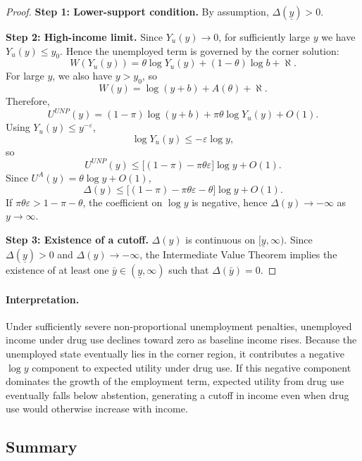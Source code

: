 \begin{proof}
\textbf{Step 1: Lower-support condition.}
By assumption, $\Delta(\underline y)>0$.

\medskip
\noindent
\textbf{Step 2: High-income limit.}
Since $Y_u(y)\to 0$, for sufficiently large $y$ we have $Y_u(y)\le y_0$.
Hence the unemployed term is governed by the corner solution:
\[
W(Y_u(y))
=
\theta\log Y_u(y)
+
(1-\theta)\log b
+
\aleph.
\]
For large $y$, we also have $y>y_0$, so
\[
W(y)=\log(y+b)+A(\theta)+\aleph.
\]
Therefore,
\[
U^{UNP}(y)
=
(1-\pi)\log(y+b)
+
\pi\theta\log Y_u(y)
+
O(1).
\]
Using $Y_u(y)\le y^{-\varepsilon}$,
\[
\log Y_u(y)\le -\varepsilon\log y,
\]
so
\[
U^{UNP}(y)
\le
\big[(1-\pi)-\pi\theta\varepsilon\big]\log y
+
O(1).
\]
Since $U^{A}(y)=\theta\log y+O(1)$,
\[
\Delta(y)
\le
\big[(1-\pi)-\pi\theta\varepsilon-\theta\big]\log y
+
O(1).
\]
If $\pi\theta\varepsilon>1-\pi-\theta$, the coefficient on $\log y$ is negative, hence $\Delta(y)\to -\infty$ as $y\to\infty$.

\medskip
\noindent
\textbf{Step 3: Existence of a cutoff.}
$\Delta(y)$ is continuous on $[\underline y,\infty)$. Since $\Delta(\underline y)>0$ and $\Delta(y)\to -\infty$, the Intermediate Value Theorem implies the existence of at least one $\bar y\in(\underline y,\infty)$ such that $\Delta(\bar y)=0$.
\end{proof}

\paragraph{Interpretation.}
Under sufficiently severe non-proportional unemployment penalties,
unemployed income under drug use declines toward zero as baseline income rises. Because the unemployed state eventually lies in the corner region, it contributes a negative $\log y$ component to expected utility under drug use. If this negative component dominates the growth of the employment term, expected utility from drug use eventually falls below abstention, generating a cutoff in income even when drug use would otherwise increase with income.

\subsection{Summary}

